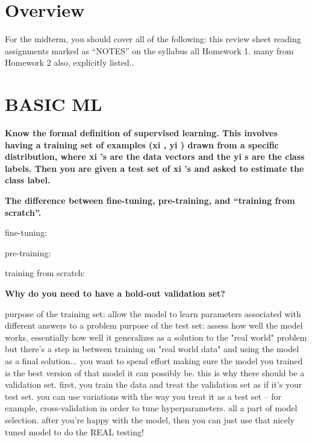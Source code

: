 \documentclass[10pt,letterpaper]{article}
\date{}
\begin{document}
\section{Overview}

For the midterm, you should cover all of the following:
\subitem this review sheet
\subitem reading assignments marked as “NOTES” on the syllabus
\subitem all Homework 1. many from Homework 2 also, explicitly listed..

\section{BASIC ML}


\subitem \textbf{ Know the formal definition of supervised learning. This involves having a training set of examples (xi , yi ) drawn from a specific distribution, where xi ’s are the data vectors and the yi s are the class labels. Then you are given a test set of xi ’s and asked to estimate the class label.}
\begin{solution}
\end{solution}

\subitem \textbf{ The difference between fine-tuning, pre-training, and “training from scratch”.}
\begin{solution}
fine-tuning:

\par
pre-training:

\par
training from scratch:
\end{solution}

\subitem \textbf{ Why do you need to have a hold-out validation set?}
\begin{solution}
purpose of the training set: allow the model to learn parameters associated with different answers to a problem \newline
purpose of the test set: assess how well the model works, essentially how well it generalizes as a solution to the "real world" problem \newline \newline 
but there's a step in between training on "real world data" and using the model as a final solution... you want to spend effort making sure the model you trained is the best version of that model it can possibly be. this is why there should be a validation set. \newline
first, you train the data and treat the validation set as if it's your test set. you can use variations with the way you treat it as a test set -- for example, cross-validation in order to tune hyperparameters. all a part of model selection. after you're happy with the model, then you can just use that nicely tuned model to do the REAL testing!
\end{solution}
\end{document}
